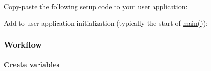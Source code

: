 \begin{DoxyCodeInclude}{0}
\end{DoxyCodeInclude}
 Copy-\/paste the following setup code to your user application\+: 
\begin{DoxyCodeInclude}{0}
\end{DoxyCodeInclude}
 Add to user application initialization (typically the start of {\ttfamily \mbox{\hyperlink{csc__app_8c_a840291bc02cba5474a4cb46a9b9566fe}{main()}}})\+: 
\begin{DoxyCodeInclude}{0}
\end{DoxyCodeInclude}
 \hypertarget{asfdoc_sam0_sercom_usart_dma_use_case_asfdoc_sam0_usart_dma_use_case_setup_flow}{}\subsubsection{Workflow}\label{asfdoc_sam0_sercom_usart_dma_use_case_asfdoc_sam0_usart_dma_use_case_setup_flow}
\hypertarget{asfdoc_sam0_sercom_usart_dma_use_case_asfdoc_sam0_usart_dma_use_case_setup_flow_inst}{}\paragraph{Create variables}\label{asfdoc_sam0_sercom_usart_dma_use_case_asfdoc_sam0_usart_dma_use_case_setup_flow_inst}

